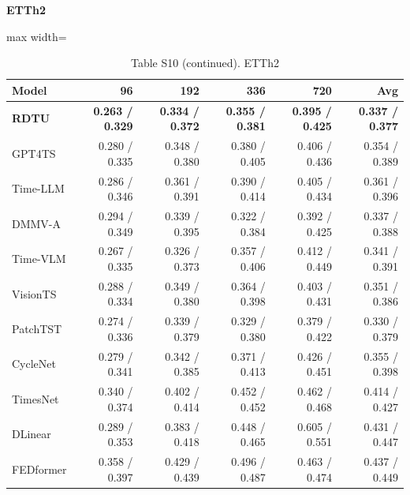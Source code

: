 \begin{table}[H]\centering\small
\caption*{Table S10 (continued). ETTh2}
\textbf{ETTh2}\par\smallskip
\begin{adjustbox}{max width=\linewidth}\begin{tabular}{lrrrrr}\toprule
\textbf{Model} & \textbf{96} & \textbf{192} & \textbf{336} & \textbf{720} & \textbf{Avg}\\\midrule
\rowcolor{blue!5}
\textbf{RDTU} & \textbf{0.263 / 0.329} & \textbf{0.334 / 0.372} & \textbf{0.355 / 0.381} & \textbf{0.395 / 0.425} & \textbf{0.337 / 0.377}\\
GPT4TS & 0.280 / 0.335 & 0.348 / 0.380 & 0.380 / 0.405 & 0.406 / 0.436 & 0.354 / 0.389\\
Time-LLM & 0.286 / 0.346 & 0.361 / 0.391 & 0.390 / 0.414 & 0.405 / 0.434 & 0.361 / 0.396\\
DMMV-A & 0.294 / 0.349 & 0.339 / 0.395 & 0.322 / 0.384 & 0.392 / 0.425 & 0.337 / 0.388\\
Time-VLM & 0.267 / 0.335 & 0.326 / 0.373 & 0.357 / 0.406 & 0.412 / 0.449 & 0.341 / 0.391\\
VisionTS & 0.288 / 0.334 & 0.349 / 0.380 & 0.364 / 0.398 & 0.403 / 0.431 & 0.351 / 0.386\\
PatchTST & 0.274 / 0.336 & 0.339 / 0.379 & 0.329 / 0.380 & 0.379 / 0.422 & 0.330 / 0.379\\
CycleNet & 0.279 / 0.341 & 0.342 / 0.385 & 0.371 / 0.413 & 0.426 / 0.451 & 0.355 / 0.398\\
TimesNet & 0.340 / 0.374 & 0.402 / 0.414 & 0.452 / 0.452 & 0.462 / 0.468 & 0.414 / 0.427\\
DLinear & 0.289 / 0.353 & 0.383 / 0.418 & 0.448 / 0.465 & 0.605 / 0.551 & 0.431 / 0.447\\
FEDformer & 0.358 / 0.397 & 0.429 / 0.439 & 0.496 / 0.487 & 0.463 / 0.474 & 0.437 / 0.449\\
\bottomrule\end{tabular}\end{adjustbox}\end{table}
